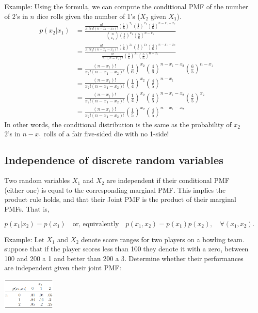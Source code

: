 \documentclass[
]{book}
\begin{document}
Example: Using the formula, we can compute the conditional PMF of the number of 2's in \(n\) dice rolls given the number of 1's (\(X_2\) given \(X_1\)).\\
\begin{align*}
p(x_2|x_1) &= \frac{\frac{n!}{x_1! x_2! (n-x_1 -x_2)!}(\tfrac16)^{x_1}(\tfrac16)^{x_2}(\tfrac46)^{n-x_1-x_2}}{{n \choose x_1}(\tfrac16)^{x_1}(\tfrac56)^{n-x_1}}\\
& = \frac{\frac{n!}{x_1! x_2! (n-x_1 -x_2)!}(\tfrac16)^{x_1}(\tfrac16)^{x_2}(\tfrac46)^{n-x_1-x_2}}{\frac{n!}{x_1!(n-x_1)!}(\tfrac16)^{x_1}(\tfrac56)^{n-x_1}}\\
& = \frac{(n-x_1)!}{x_2!(n-x_1-x_2)!}(\tfrac16)^{x_2}(\tfrac46)^{n-x_1-x_2}(\tfrac65)^{n-x_1}\\
&=\frac{(n-x_1)!}{x_2!(n-x_1-x_2)!}(\tfrac14)^{x_2}(\tfrac45)^{n-x_1}\\
& = \frac{(n-x_1)!}{x_2!(n-x_1-x_2)!}(\tfrac14)^{x_2}(\tfrac45)^{n-x_1-x_2}(\tfrac{4}{5})^{x_2}\\
& = \frac{(n-x_1)!}{x_2!(n-x_1-x_2)!}(\tfrac15)^{x_2}(\tfrac45)^{n-x_1-x_2}
\end{align*}
In other words, the conditional distribution is the same as the probability of \(x_2\) 2's in \(n-x_1\) rolls of a fair five-sided die with no 1-side!

\hypertarget{independence-of-discrete-random-variables}{%
\subsection{Independence of discrete random variables}\label{independence-of-discrete-random-variables}}

Two random variables \(X_1\) and \(X_2\) are independent if their conditional PMF (either one) is equal to the corresponding marginal PMF. This implies the product rule holds, and that their Joint PMF is the product of their marginal PMFs. That is,

\[p(x_1|x_2) = p(x_1)\quad\text{or, equivalently}\quad p(x_1,x_2)=p(x_1)p(x_2), \quad \forall (x_1,x_2).\]

Example: Let \(X_1\) and \(X_2\) denote score ranges for two players on a bowling team. suppose that if the player scores less than 100 they denote it with a zero, between 100 and 200 a 1 and better than 200 a 3. Determine whether their performances are independent given their joint PMF:

\includegraphics[width=0.2\textwidth,height=\textheight]{joint_pmf_ind.PNG}
\end{document}
